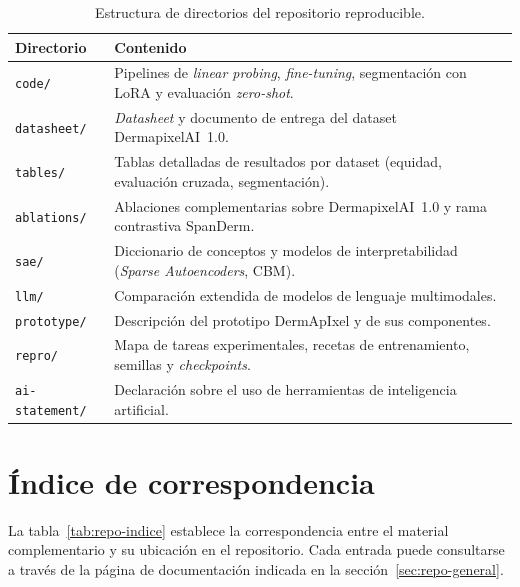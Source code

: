 \begin{table}[H]
\centering
\footnotesize
\setlength{\tabcolsep}{5pt}
\renewcommand{\arraystretch}{1.05}
\caption{Estructura de directorios del repositorio reproducible.}
\label{tab:repo-estructura}
\begin{tabular}{ll}
\hline
Directorio & Contenido \\
\hline
\texttt{code/} & Pipelines de \emph{linear probing}, \emph{fine-tuning}, segmentación con LoRA y evaluación \emph{zero-shot}. \\
\texttt{datasheet/} & \emph{Datasheet} y documento de entrega del dataset DermapixelAI~1.0. \\
\texttt{tables/} & Tablas detalladas de resultados por dataset (equidad, evaluación cruzada, segmentación). \\
\texttt{ablations/} & Ablaciones complementarias sobre DermapixelAI~1.0 y rama contrastiva SpanDerm. \\
\texttt{sae/} & Diccionario de conceptos y modelos de interpretabilidad (\emph{Sparse Autoencoders}, CBM). \\
\texttt{llm/} & Comparación extendida de modelos de lenguaje multimodales. \\
\texttt{prototype/} & Descripción del prototipo DermApIxel y de sus componentes. \\
\texttt{repro/} & Mapa de tareas experimentales, recetas de entrenamiento, semillas y \emph{checkpoints}. \\
\texttt{ai-statement/} & Declaración sobre el uso de herramientas de inteligencia artificial. \\
\hline
\end{tabular}
\end{table}

\section{Índice de correspondencia}
\label{sec:repo-indice}

La tabla~\ref{tab:repo-indice} establece la correspondencia entre el
material complementario y su ubicación en el repositorio. Cada
entrada puede consultarse a través de la página de documentación
indicada en la sección~\ref{sec:repo-general}.

